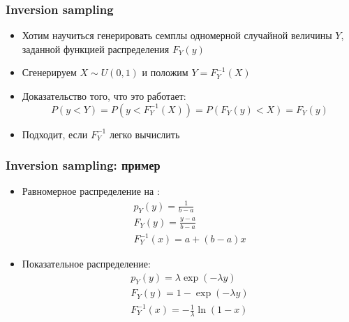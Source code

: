 \documentclass[handout,10pt]{beamer}
\begin{document}
\begin{frame}[fragile]
\frametitle{Inversion sampling}
\begin{itemize}
\item Хотим научиться генерировать семплы одномерной случайной величины \begin{math}Y\end{math}, заданной функцией распределения \begin{math}F_Y(y)\end{math}
\pause
\item Сгенерируем \begin{math}X\sim U(0,1)\end{math} и положим \begin{math}Y = F_Y^{-1}(X)\end{math}
\pause
\item Доказательство того, что это работает:
\begin{equation*}
P(y < Y) = P(y < F_Y^{-1}(X)) = P(F_Y(y) < X) = F_Y(y)
\end{equation*}
\pause
\item Подходит, если \begin{math}F_Y^{-1}\end{math} легко вычислить
\end{itemize}
\end{frame}

\begin{frame}[fragile]
\frametitle{Inversion sampling: пример}
\begin{itemize}
\item Равномерное распределение на \begin{math}[a, b]\end{math}:
\begin{gather*}
p_Y(y) = \frac{1}{b-a} \\
F_Y(y) = \frac{y-a}{b-a} \\
F_Y^{-1}(x) = a + (b-a)x
\end{gather*}
\pause
\item Показательное распределение:
\begin{gather*}
p_Y(y) = \lambda\exp(-\lambda y) \\
F_Y(y) = 1 - \exp(-\lambda y) \\
F_Y^{-1}(x) = -\frac{1}{\lambda}\ln(1-x)
\end{gather*}
\end{itemize}
\end{frame}
\end{document}
